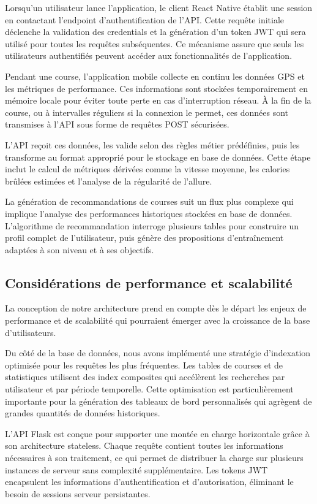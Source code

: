Lorsqu'un utilisateur lance l'application, le client React Native établit une session en contactant l'endpoint d'authentification de l'API. Cette requête initiale déclenche la validation des credentials et la génération d'un token JWT qui sera utilisé pour toutes les requêtes subséquentes. Ce mécanisme assure que seuls les utilisateurs authentifiés peuvent accéder aux fonctionnalités de l'application.

Pendant une course, l'application mobile collecte en continu les données GPS et les métriques de performance. Ces informations sont stockées temporairement en mémoire locale pour éviter toute perte en cas d'interruption réseau. À la fin de la course, ou à intervalles réguliers si la connexion le permet, ces données sont transmises à l'API sous forme de requêtes POST sécurisées.

L'API reçoit ces données, les valide selon des règles métier prédéfinies, puis les transforme au format approprié pour le stockage en base de données. Cette étape inclut le calcul de métriques dérivées comme la vitesse moyenne, les calories brûlées estimées et l'analyse de la régularité de l'allure.

La génération de recommandations de courses suit un flux plus complexe qui implique l'analyse des performances historiques stockées en base de données. L'algorithme de recommandation interroge plusieurs tables pour construire un profil complet de l'utilisateur, puis génère des propositions d'entraînement adaptées à son niveau et à ses objectifs.

\subsection{Considérations de performance et scalabilité}

La conception de notre architecture prend en compte dès le départ les enjeux de performance et de scalabilité qui pourraient émerger avec la croissance de la base d'utilisateurs.

Du côté de la base de données, nous avons implémenté une stratégie d'indexation optimisée pour les requêtes les plus fréquentes. Les tables de courses et de statistiques utilisent des index composites qui accélèrent les recherches par utilisateur et par période temporelle. Cette optimisation est particulièrement importante pour la génération des tableaux de bord personnalisés qui agrègent de grandes quantités de données historiques.

L'API Flask est conçue pour supporter une montée en charge horizontale grâce à son architecture stateless. Chaque requête contient toutes les informations nécessaires à son traitement, ce qui permet de distribuer la charge sur plusieurs instances de serveur sans complexité supplémentaire. Les tokens JWT encapsulent les informations d'authentification et d'autorisation, éliminant le besoin de sessions serveur persistantes.

